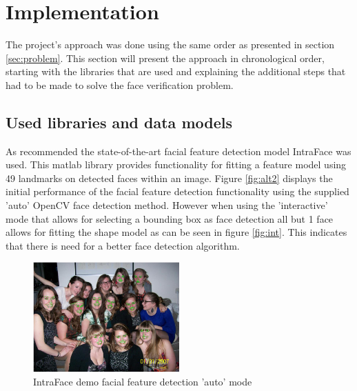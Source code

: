 \documentclass[10pt,a4paper,twocolumn]{article}
\begin{document}

\section{Implementation}
\label{sec:implementation}

The project's approach was done using the same order as presented in section \ref{sec:problem}. This section will present the approach in chronological order, starting with the libraries that are used and explaining the additional steps that had to be made to solve the face verification problem. 

\subsection{Used libraries and data models}
As recommended the state-of-the-art facial feature detection model IntraFace was used. This matlab library provides functionality for fitting a feature model using 49 landmarks on detected faces within an image. Figure \ref{fig:alt2} displays the initial performance of the facial feature detection functionality using the supplied 'auto' OpenCV face detection method. However when using the 'interactive' mode that allows for selecting a bounding box as face detection all but 1 face allows for fitting the shape model as can be seen in figure \ref{fig:int}. This indicates that there is need for a better face detection algorithm.

\begin{figure}[!h]
	\begin{center}
	\includegraphics[width=0.5\textwidth]{alt2.jpg}
	\caption{IntraFace demo facial feature detection 'auto' mode}
	\label{fig:alt}
	\end{center}
\end{figure}
\end{document}
